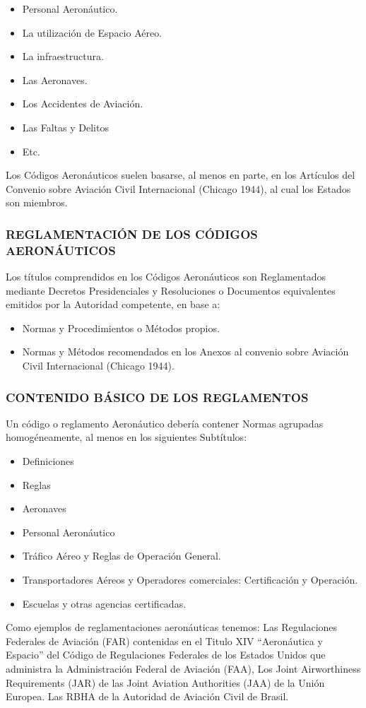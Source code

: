 \begin{itemize}
  \item Personal Aeronáutico.
  \item La utilización de Espacio Aéreo.
  \item La infraestructura.
  \item Las Aeronaves.
  \item Los Accidentes de Aviación.
  \item Las Faltas y Delitos
  \item Etc.
\end{itemize}
Los Códigos Aeronáuticos suelen basarse, al menos en parte, en los Artículos del Convenio sobre Aviación Civil Internacional (Chicago 1944), al cual los Estados son miembros.

\subsubsection*{REGLAMENTACIÓN DE LOS CÓDIGOS AERONÁUTICOS}
Los títulos comprendidos en los Códigos Aeronáuticos son Reglamentados mediante Decretos Presidenciales y Resoluciones o Documentos equivalentes emitidos por la Autoridad competente, en base a:

\begin{itemize}
  \item Normas y Procedimientos o Métodos propios.
  \item Normas y Métodos recomendados en los Anexos al convenio sobre Aviación Civil Internacional (Chicago 1944).
\end{itemize}
\subsubsection*{CONTENIDO BÁSICO DE LOS REGLAMENTOS}
Un código o reglamento Aeronáutico debería contener Normas agrupadas homogéneamente, al menos en los siguientes Subtítulos:

\begin{itemize}
  \item Definiciones
  \item Reglas
  \item Aeronaves
  \item Personal Aeronáutico
  \item Tráfico Aéreo y Reglas de Operación General.
  \item Transportadores Aéreos y Operadores comerciales: Certificación y Operación.
  \item Escuelas y otras agencias certificadas.
\end{itemize}
Como ejemplos de reglamentaciones aeronáuticas tenemos: Las Regulaciones Federales de Aviación (FAR) contenidas en el Titulo XIV “Aeronáutica y Espacio” del Código de Regulaciones Federales de los Estados Unidos que administra la Administración Federal de Aviación (FAA), Los Joint Airworthiness Requirements (JAR) de las Joint Aviation Authorities (JAA) de la Unión Europea. Las RBHA de la Autoridad de Aviación Civil de Brasil.


